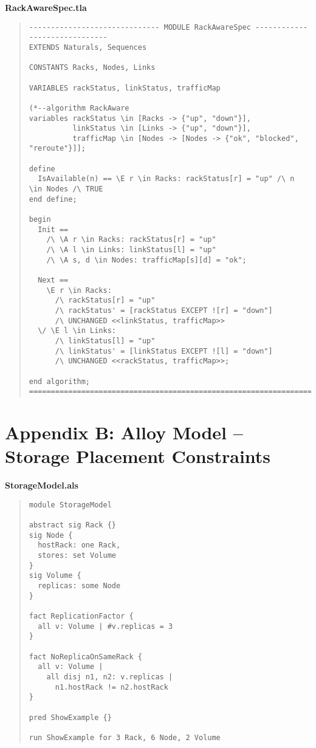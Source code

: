 \begin{marginfigure}
\footnotesize
\textbf{RackAwareSpec.tla}
\end{marginfigure}

\begin{quote}
\scriptsize
\begin{verbatim}
------------------------------ MODULE RackAwareSpec ------------------------------
EXTENDS Naturals, Sequences

CONSTANTS Racks, Nodes, Links

VARIABLES rackStatus, linkStatus, trafficMap

(*--algorithm RackAware
variables rackStatus \in [Racks -> {"up", "down"}],
          linkStatus \in [Links -> {"up", "down"}],
          trafficMap \in [Nodes -> [Nodes -> {"ok", "blocked", "reroute"}]];

define
  IsAvailable(n) == \E r \in Racks: rackStatus[r] = "up" /\ n \in Nodes /\ TRUE
end define;

begin
  Init ==
    /\ \A r \in Racks: rackStatus[r] = "up"
    /\ \A l \in Links: linkStatus[l] = "up"
    /\ \A s, d \in Nodes: trafficMap[s][d] = "ok";

  Next ==
    \E r \in Racks:
      /\ rackStatus[r] = "up"
      /\ rackStatus' = [rackStatus EXCEPT ![r] = "down"]
      /\ UNCHANGED <<linkStatus, trafficMap>>
  \/ \E l \in Links:
      /\ linkStatus[l] = "up"
      /\ linkStatus' = [linkStatus EXCEPT ![l] = "down"]
      /\ UNCHANGED <<rackStatus, trafficMap>>;

end algorithm;
===============================================================================
\end{verbatim}
\end{quote}

\newpage
\section*{Appendix B: Alloy Model -- Storage Placement Constraints}

\begin{marginfigure}
\footnotesize
\textbf{StorageModel.als}
\end{marginfigure}

\begin{quote}
\scriptsize
\begin{verbatim}
module StorageModel

abstract sig Rack {}
sig Node {
  hostRack: one Rack,
  stores: set Volume
}
sig Volume {
  replicas: some Node
}

fact ReplicationFactor {
  all v: Volume | #v.replicas = 3
}

fact NoReplicaOnSameRack {
  all v: Volume |
    all disj n1, n2: v.replicas |
      n1.hostRack != n2.hostRack
}

pred ShowExample {}

run ShowExample for 3 Rack, 6 Node, 2 Volume
\end{verbatim}
\end{quote}
